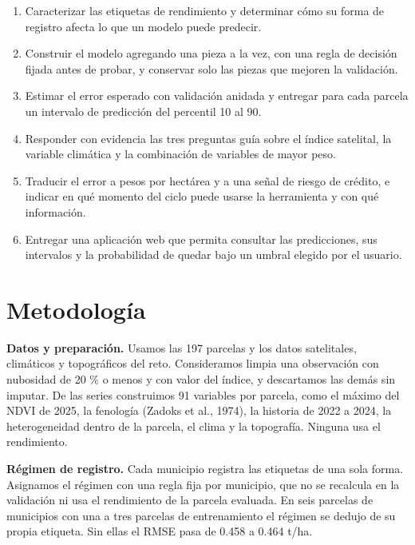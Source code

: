 \documentclass[11pt,letterpaper]{article}
\begin{document}
\begin{enumerate}

\item Caracterizar las etiquetas de rendimiento y determinar cómo su forma de registro afecta lo que un modelo puede predecir.

\item Construir el modelo agregando una pieza a la vez, con una regla de decisión fijada antes de probar, y conservar solo las piezas que mejoren la validación.

\item Estimar el error esperado con validación anidada y entregar para cada parcela un intervalo de predicción del percentil 10 al 90.

\item Responder con evidencia las tres preguntas guía sobre el índice satelital, la variable climática y la combinación de variables de mayor peso.

\item Traducir el error a pesos por hectárea y a una señal de riesgo de crédito, e indicar en qué momento del ciclo puede usarse la herramienta y con qué información.

\item Entregar una aplicación web que permita consultar las predicciones, sus intervalos y la probabilidad de quedar bajo un umbral elegido por el usuario.

\end{enumerate}

\section{Metodología}

\textbf{Datos y preparación.} Usamos las 197 parcelas y los datos satelitales, climáticos y topográficos del reto. Consideramos limpia una observación con nubosidad de 20 \% o menos y con valor del índice, y descartamos las demás sin imputar. De las series construimos 91 variables por parcela, como el máximo del NDVI de 2025, la fenología (Zadoks et al., 1974), la historia de 2022 a 2024, la heterogeneidad dentro de la parcela, el clima y la topografía. Ninguna usa el rendimiento.

\textbf{Régimen de registro.} Cada municipio registra las etiquetas de una sola forma. Asignamos el régimen con una regla fija por municipio, que no se recalcula en la validación ni usa el rendimiento de la parcela evaluada. En seis parcelas de municipios con una a tres parcelas de entrenamiento el régimen se dedujo de su propia etiqueta. Sin ellas el RMSE pasa de 0.458 a 0.464 t/ha.
\end{document}
